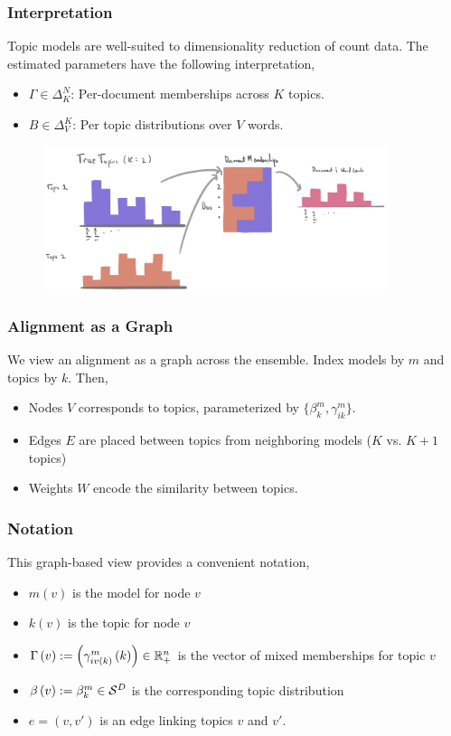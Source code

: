 \documentclass[hyperref={colorlinks=true, linkcolor=violet, citecolor=SeaGreen}]{beamer}
\begin{document}
\begin{frame}
  \frametitle{Interpretation}
Topic models are well-suited to dimensionality reduction of count data. The
estimated parameters have the following interpretation,
\begin{itemize}
  \item $\Gamma \in \Delta_{K}^{N}$: Per-document memberships across $K$ topics.
  \item $B \in \Delta_{V}^{K}$: Per topic distributions over $V$ words.
\end{itemize}

\begin{figure}
\centering
\includegraphics[width=0.9\textwidth]{lda_overview}
\end{figure}
\end{frame}

\begin{frame}
  \frametitle{Alignment as a Graph}
  We view an alignment as a graph across the ensemble. Index models by $m$ and
  topics by $k$. Then,
  \begin{itemize}
    \item Nodes $V$ corresponds to topics, parameterized by $\{\beta^m_{k},
    \gamma^m_{ik}\}$.
    \item Edges $E$ are placed between topics from neighboring models ($K$ vs.
    $K + 1$ topics)
    \item Weights $W$ encode the similarity between topics.
  \end{itemize}
\end{frame}

\begin{frame}
  \frametitle{Notation}
  This graph-based view provides a convenient notation,
  \begin{itemize}
  \item $m\left(v\right)$ is the model for node $v$
  \item $k\left(v\right)$ is the topic for node $v$
  \item $\Gamma\left(v\right) := \left(\gamma_{i
  v\left(k\right)}^m\left(k\right)\right) \in \mathbb{R}^n_{+}$ is the vector of
  mixed memberships for topic $v$
  \item $\beta\left(v\right) := \beta_{k}^m \in \mathcal{S}^{D}$ is the
  corresponding topic distribution
  \item $e = \left(v, v'\right)$ is an edge linking topics $v$ and $v'$.
  \end{itemize}
\end{frame}
\end{document}
